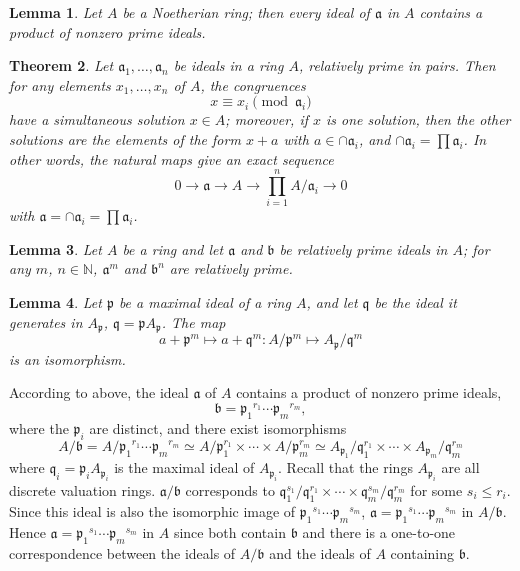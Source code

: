 \documentclass[11pt,a4paper,reqno]{amsart}
\numberwithin{equation}{section}
\newtheorem{thm}{Theorem}[section]
\newtheorem{lem}[thm]{Lemma}
\begin{document}
\begin{lem}\label{3.8}
Let $A$ be a Noetherian ring; then every ideal of $\mathfrak{a}$ in $A$ contains a product of nonzero prime ideals.
\end{lem}

\begin{thm}\label{1.14}
Let ${\mathfrak{a}_1},\dots,{\mathfrak{a}_n}$ be ideals in a ring $A$, relatively prime in pairs. 
Then for any elements ${x_1},\dots,{x_n}$ of $A$, the congruences 
\[
x\equiv{x_i} \pmod{\mathfrak{a}_i}
\]
have a simultaneous solution $x \in A$; moreover, if $x$ is one solution, 
then the other solutions are the elements of the form $x+a$ with $a \in \cap{\mathfrak{a}_i}$, and $\cap {\mathfrak{a}_i} = \prod {\mathfrak{a}_i}$.
In other words, the natural maps give an exact sequence
\[
0 \to \mathfrak{a} \to A \to {\prod_{i=1}^{n} {A/{\mathfrak{a}_i}}} \to 0
\]
with $\mathfrak{a}=\cap{\mathfrak{a}_i}=\prod{\mathfrak{a}_i}$.
\end{thm}

\begin{lem}\label{3.9}
Let $A$ be a ring and let $\mathfrak{a}$ and $\mathfrak{b}$ be relatively prime ideals in $A$; for any $m$, $n \in \mathbb{N}$, $\mathfrak{a}^m$ and $\mathfrak{b}^n$ are relatively prime.
\end{lem}

\begin{lem}\label{3.10}
Let $\mathfrak{p}$ be a maximal ideal of a ring $A$, and let $\mathfrak{q}$ be the ideal it generates in $A_{\mathfrak{p}}$, $\mathfrak{q}=\mathfrak{p}A_{\mathfrak{p}}$. The map
\[
{a+\mathfrak{p}^m}\mapsto{a+\mathfrak{q}^m}:{A/{\mathfrak{p}^m}}\mapsto{{A_{\mathfrak{p}}}/{\mathfrak{q}^m}}
\]
is an isomorphism.
\end{lem}

According to above, the ideal $\mathfrak{a}$ of $A$ contains a product of nonzero prime ideals, 
\[
\mathfrak{b}={\mathfrak{p}_1}^{r_1} \cdots {\mathfrak{p}_m}^{r_m},
\]
where the $\mathfrak{p}_i$ are distinct, and there exist isomorphisms
\[
A/{\mathfrak{b}}=A/{{\mathfrak{p}_1}^{r_1} \cdots {\mathfrak{p}_m}^{r_m}}
 \simeq A/{{\mathfrak{p}^{r_1}_1}} \times \cdots \times A/{{\mathfrak{p}^{r_m}_m}}
 \simeq {A_{\mathfrak{p}_1}}/{{\mathfrak{q}^{r_1}_1}} \times \cdots \times {A_{\mathfrak{p}_m}}/{{\mathfrak{q}^{r_m}_m}}
\]
where $\mathfrak{q}_i = \mathfrak{p}_i A_{\mathfrak{p}_i}$ is the maximal ideal of $A_{\mathfrak{p}_i}$. 
Recall that the rings $A_{\mathfrak{p}_i}$ are all discrete valuation rings. 
$\mathfrak{a}/\mathfrak{b}$ corresponds to ${\mathfrak{q}^{s_1}_1}/{\mathfrak{q}^{r_1}_1} \times \cdots \times {\mathfrak{q}^{s_m}_m}/{\mathfrak{q}^{r_m}_m}$ for some $s_i \leq r_i$.
Since this ideal is also the isomorphic image of ${\mathfrak{p}_1}^{s_1} \cdots {\mathfrak{p}_m}^{s_m}$, $\mathfrak{a}={\mathfrak{p}_1}^{s_1} \cdots {\mathfrak{p}_m}^{s_m}$ in $A/{\mathfrak{b}}$.
Hence $\mathfrak{a}={\mathfrak{p}_1}^{s_1} \cdots {\mathfrak{p}_m}^{s_m}$ in $A$ since both contain $\mathfrak{b}$ and there is a one-to-one correspondence between the ideals of $A/\mathfrak{b}$ and the ideals of $A$ containing $\mathfrak{b}$.
\end{document}
